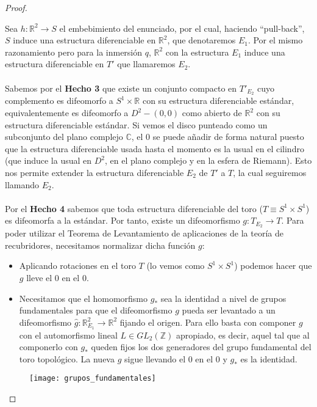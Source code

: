 \begin{proof}
\begin{enumerate}
			Sea $h:\mathbb{R}^2 \rightarrow S$ el embebimiento del enunciado, por el cual, haciendo ``pull-back'', $S$ induce una estructura diferenciable en $\mathbb{R}^2$, que denotaremos $E_1$. Por el mismo razonamiento pero para la inmersión $q$, $\mathbb{R}^2$ con la estructura $E_1$ induce una estructura diferenciable en $T'$ que llamaremos $E_2$.\\
			\\ Sabemos por el \textbf{Hecho 3} que existe un conjunto compacto en $T'_{E_2}$ cuyo complemento es difeomorfo a $S^1\times \mathbb{R}$ con su estructura diferenciable estándar, equivalentemente es difeomorfo a $D^2 - {(0,0)}$ como abierto de $\mathbb{R}^2$ con su estructura diferenciable estándar. Si vemos el disco punteado como un subconjunto del plano complejo $\mathbb{C}$, el $0$ se puede añadir de forma natural puesto que la estructura diferenciable usada hasta el momento es la usual en el cilindro (que induce la usual en $D^2$, en el plano complejo y en la esfera de Riemann). Esto nos permite extender la estructura diferenciable $E_2$ de $T'$ a $T$, la cual seguiremos llamando $E_2$.\\
			\\ Por el \textbf{Hecho 4} sabemos que toda estructura diferenciable del toro ($T \equiv S^1\times S^1$) es difeomorfa a la estándar. Por tanto, existe un difeomorfismo $g: T_{E_2} \rightarrow T$. Para poder utilizar el Teorema de Levantamiento de aplicaciones de la teoría de recubridores, necesitamos normalizar dicha función $g$:
						
			\begin{itemize}
				\item Aplicando rotaciones en el toro $T$ (lo vemos como $S^1\times S^1$) podemos hacer que $g$ lleve el $0$ en el $0$.
				\item Necesitamos que el homomorfismo $g_*$ sea la identidad a nivel de grupos fundamentales para que el difeomorfismo $g$ pueda ser levantado a un difeomorfismo $\widehat{g} : \mathbb{R}^2_{E_1} \rightarrow \mathbb{R}^2$ fijando el origen. Para ello basta con componer $g$ con el automorfismo lineal $L \in GL_2(\mathbb{Z})$ apropiado, es decir, aquel tal que al componerlo con $g_*$ queden fijos los dos generadores del grupo fundamental del toro topológico. La nueva $g$ sigue llevando el $0$ en el $0$ y $g_*$ es la identidad.\\
			\end{itemize}
			
			\begin{figure}[h]
  				\centering
  				\texttt{[image: grupos\_fundamentales]}
  				\label{fig:fundamental}
			\end{figure}
			 

\end{enumerate}
\end{proof}
